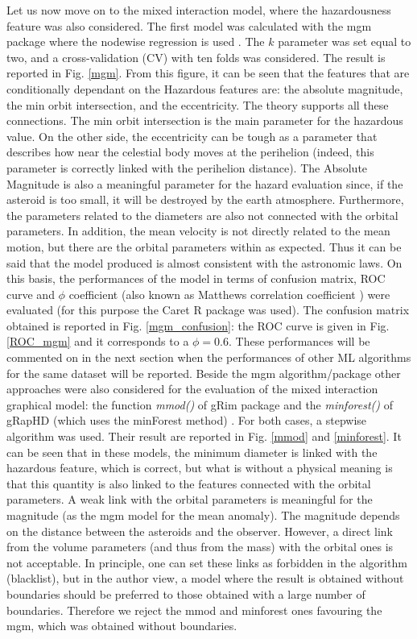 \documentclass[12pt,%
               a4paper,%
               oneside,openany,%
               titlepage,%
               headinclude,footinclude,%
               BCOR5mm,%
               cleardoublepage=empty,%
               tablecaptionabove,%
               floatperchapter,
               ]{scrreprt}                 %
\begin{document}
Let us now move on to the mixed interaction model, where the hazardousness feature was also considered.  The first model was calculated with the mgm package  \cite{mgm,haslbeck2015mgm} where the nodewise regression is used \cite{meinshausen2006high}. The $k$ parameter was set equal to two, and a cross-validation (CV) with ten folds was considered. The result is reported in Fig. \ref{mgm}. From this figure, it can be seen that the features that are conditionally dependant on the Hazardous features are: the absolute magnitude, the min orbit intersection, and the eccentricity.  The theory supports all these connections. The min orbit intersection is the main parameter for the hazardous value. On the other side, the eccentricity can be tough as a parameter that describes how near the celestial body moves at the perihelion (indeed, this parameter is correctly linked with the perihelion distance). The Absolute Magnitude is also a meaningful parameter for the hazard evaluation since, if the asteroid is too small, it will be destroyed by the earth atmosphere.  Furthermore, the parameters related to the diameters are also not connected with the orbital parameters. In addition, the mean velocity is not directly related to the mean motion, but there are the orbital parameters within as expected. Thus it can be said that the model produced is almost consistent with the astronomic laws. On this basis, the performances of the model in terms of confusion matrix, ROC curve and $\phi$ coefficient (also known as Matthews correlation coefficient ) were evaluated (for this purpose the Caret R package \cite{kuhn2008building,caret} was used). The confusion matrix obtained is reported in Fig. \ref{mgm_confusion}: the ROC curve is given in Fig. \ref{ROC_mgm} and it corresponds to a $\phi=0.6$. These performances will be commented on in the next section when the performances of other ML algorithms for the same dataset will be reported. Beside the mgm algorithm/package other approaches were also considered for the evaluation of the mixed interaction graphical model: the function \textit{mmod()} of gRim package \cite{hojsgaard2012graphical} and the \textit{minforest()} of gRapHD (which uses the minForest method) \cite{de2009high}. For both cases, a stepwise algorithm was used.  Their result are reported in Fig. \ref{mmod} and \ref{minforest}. It can be seen that in these models, the minimum diameter is linked with the hazardous feature, which is correct, but what is without a physical meaning is that this quantity is also linked to the features connected with the orbital parameters. A weak link with the orbital parameters is meaningful for the magnitude (as the mgm model for the mean anomaly).  The magnitude depends on the distance between the asteroids and the observer.   However, a direct link from the volume parameters (and thus from the mass) with the orbital ones is not acceptable. In principle, one can set these links as forbidden in the algorithm (blacklist), but in the author view, a model where the result is obtained without boundaries should be preferred to those obtained with a large number of boundaries. Therefore we reject the mmod and minforest ones favouring the mgm, which was obtained without boundaries. 
\end{document}
